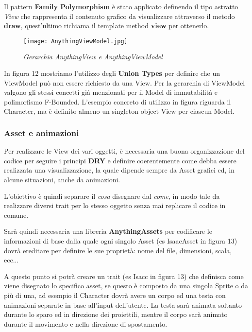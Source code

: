 Il pattern \textbf{Family Polymorphism} è stato applicato definendo il tipo astratto \textit{View} che rappresenta il contenuto grafico da visualizzare attraverso il metodo \textbf{draw}, quest'ultimo richiama il template method \textbf{view} per ottenerlo.

\begin{figure}[!hbt]
    \centering
    \texttt{[image: AnythingViewModel.jpg]}
    \caption{\textit{Gerarchia AnythingView e AnythingViewModel}} 
\end{figure}

In figura 12 mostriamo l'utilizzo degli \textbf{Union Types} per definire che un ViewModel può non essere richiesto da una View.
Per la gerarchia di ViewModel valgono gli stessi concetti già menzionati per il Model di immutabilità e polimorfismo F-Bounded.
L'esempio concreto di utilizzo in figura riguarda il Character, ma è definito almeno un singleton object View per ciascun Model.

\subsubsection{Asset e animazioni}

Per realizzare le View dei vari oggetti, è necessaria una buona organizzazione del codice 
per seguire i principi \textbf{DRY} e definire coerentemente come debba essere realizzata una visualizzazione, 
la quale dipende sempre da Asset grafici ed, in alcune situazioni, anche da animazioni. 

L'obiettivo è quindi separare il \textit{cosa} disegnare dal \textit{come}, 
in modo tale da realizzare diversi trait per lo stesso oggetto senza mai replicare il codice in comune.

Sarà quindi necessaria una libreria \textbf{AnythingAssets} per codificare le informazioni di base 
dalla quale ogni singolo Asset (es IsaacAsset in figura 13) dovrà ereditare per definire le sue proprietà: 
nome del file, dimensioni, scala, ecc...

A questo punto si potrà creare un trait (es Isacc in figura 13) che definisca come viene disegnato lo specifico asset, 
se questo è composto da una singola Sprite o da più di una, 
ad esempio il Character dovrà avere un corpo ed una testa con animazioni separate in base all'input dell'utente. 
La testa sarà animata soltanto durante lo sparo ed in direzione dei proiettili, 
mentre il corpo sarà animato durante il movimento e nella direzione di spostamento.


